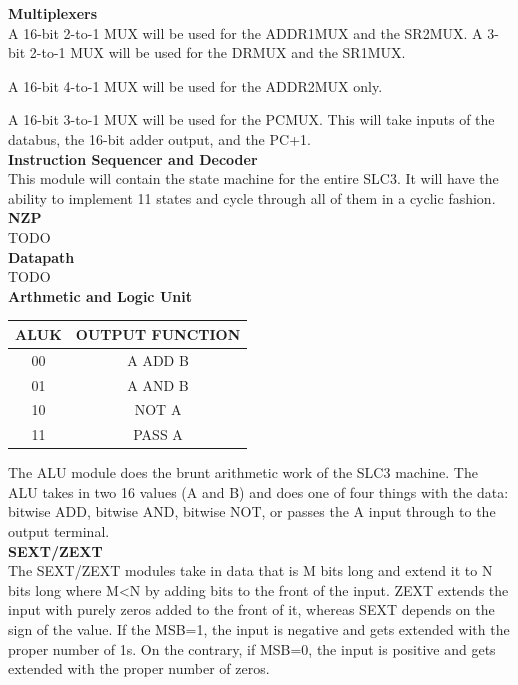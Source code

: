 \documentclass[journal, twocolumn, final,11pt,letterpaper]{IEEEtran}
\begin{document}
\normalsize\textbf{Multiplexers} \\
A 16-bit 2-to-1 MUX will be used for the ADDR1MUX and the SR2MUX. A 3-bit 2-to-1 MUX will be used for the DRMUX and the SR1MUX.

A 16-bit 4-to-1 MUX will be used for the ADDR2MUX only.

A 16-bit 3-to-1 MUX will be used for the PCMUX. This will take inputs of the databus, the 16-bit adder output, and the PC+1. \\

\normalsize\textbf{Instruction Sequencer and Decoder } \\
This module will contain the state machine for the entire SLC3. It will have the ability to implement 11 states and cycle through all of them in a cyclic fashion. \\

\normalsize\textbf{NZP} \\
TODO \\

\normalsize\textbf{Datapath} \\
TODO \\

\normalsize\textbf{Arthmetic and Logic Unit} \\
\begin{table}[htbp]
	\centering
	\begin{tabular}{cc}	%
		\toprule	%
		ALUK & OUTPUT FUNCTION \\
		\midrule
		00 & A ADD B \\
		01 & A AND B \\
		10 & NOT A \\
		11 & PASS A \\
		\bottomrule	%
	\end{tabular}%
	\label{tab:ALU-table}	%
\end{table}%

The ALU module does the brunt arithmetic work of the SLC3 machine.  The ALU takes in two 16 values (A and B) and does one of four things with the data: bitwise ADD, bitwise AND, bitwise NOT, or passes the A input through to the output terminal. \\



\normalsize\textbf{SEXT/ZEXT} \\
The SEXT/ZEXT modules take in data that is M bits long and extend it to N bits long where M<N by adding bits to the front of the input.  ZEXT extends the input with purely zeros added to the front of it, whereas SEXT depends on the sign of the value.  If the MSB=1, the input is negative and gets extended with the proper number of 1s.  On the contrary, if MSB=0, the input is positive and gets extended with the proper number of zeros.  \\
\end{document}
